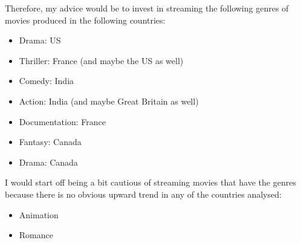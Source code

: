 \documentclass[11pt,preprint]{elsarticle}
\numberwithin{equation}{section}
\numberwithin{figure}{section}
\numberwithin{table}{section}
\def\tightlist{} %
\begin{document}
Therefore, my advice would be to invest in streaming the following
genres of movies produced in the following countries:

\begin{itemize}
\tightlist
\item
  Drama: US
\item
  Thriller: France (and maybe the US as well)
\item
  Comedy: India
\item
  Action: India (and maybe Great Britain as well)
\item
  Documentation: France
\item
  Fantasy: Canada
\item
  Drama: Canada
\end{itemize}

I would start off being a bit cautious of streaming movies that have the
genres because there is no obvious upward trend in any of the countries
analysed:

\begin{itemize}
\tightlist
\item
  Animation
\item
  Romance
\end{itemize}


\end{document}
